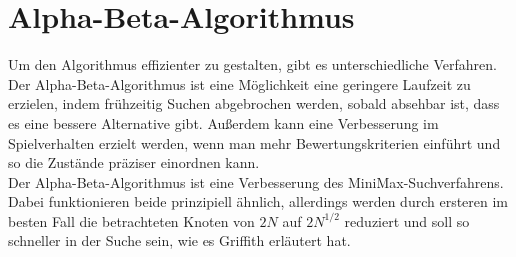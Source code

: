 


\chapter{Alpha-Beta-Algorithmus}
\label{ch:Erweiterung:sec:1.AB-Algo}
Um den Algorithmus effizienter zu gestalten, gibt es unterschiedliche Verfahren. Der Alpha-Beta-Algorithmus ist eine Möglichkeit eine geringere Laufzeit zu erzielen, indem frühzeitig Suchen abgebrochen werden, sobald absehbar ist, dass es eine bessere Alternative gibt.\nocite{AlphaBeta} Außerdem kann eine Verbesserung im Spielverhalten erzielt werden, wenn man mehr Bewertungskriterien einführt und so die Zustände präziser einordnen kann.
\nocite{edwards1961alpha} \\
Der Alpha-Beta-Algorithmus ist eine Verbesserung des MiniMax-Suchverfahrens. Dabei funktionieren beide prinzipiell ähnlich, allerdings werden durch ersteren im besten Fall die betrachteten Knoten von $2N$ auf $2N^{1/2}$ reduziert und soll so schneller in der Suche sein, wie es Griffith erläutert hat\cite{DBLP:journals/tc/Griffith76}.\\
